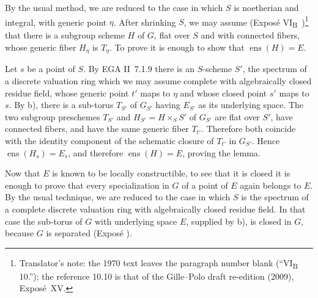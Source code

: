 
By the usual method, we are reduced to the case in which \(S\) is
noetherian and integral, with generic point \(\eta\). After shrinking
\(S\), we may assume (Exposé VI\textsubscript{B}~)\footnote{Translator's
note: the 1970 text leaves the paragraph number blank
(``VI\textsubscript{B} 10.''); the reference 10.10 is that of the
Gille--Polo draft re-edition (2009), Exposé~XV.} that there is
a subgroup scheme \(H\) of \(G\), flat over \(S\) and with connected
fibers, whose generic fiber \(H_\eta\) is \(T_\eta\). To prove  it is enough to show that \(\operatorname{ens}(H)=E\).

Let \(s\) be a point of \(S\). By EGA II~7.1.9 there is an
\(S\)-scheme \(S'\), the spectrum of a discrete valuation ring which
we may assume complete with algebraically closed residue field, whose
generic point \(t'\) maps to \(\eta\) and whose closed point \(s'\)
maps to \(s\). By \textup{ b)}, there is a sub-torus \(T_{S'}\)
of \(G_{S'}\) having \(E_{S'}\) as its underlying space. The two
subgroup preschemes \(T_{S'}\) and
\(H_{S'}=H\times_S S'\) of \(G_{S'}\) are flat over \(S'\), have
connected fibers, and have the same generic fiber \(T_{t'}\).
Therefore both coincide with the identity component of the schematic
closure of \(T_{t'}\) in \(G_{S'}\). Hence
\(\operatorname{ens}(H_s)=E_s\), and therefore
\(\operatorname{ens}(H)=E\), proving the lemma.

Now that \(E\) is known to be locally constructible, to see that it
is closed it is enough to prove that every specialization in \(G\)
of a point of \(E\) again belongs to \(E\). By the usual technique,
we are reduced to the case in which \(S\) is the spectrum of a
complete discrete valuation ring with algebraically closed residue
field. In that case the sub-torus of \(G\) with underlying space
\(E\), supplied by \textup{ b)}, is closed in \(G\), because
\(G\) is separated (Exposé ).


